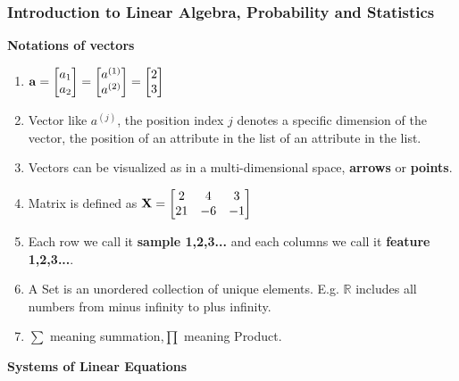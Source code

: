 \subsubsection{Introduction to Linear Algebra, Probability and Statistics}
\textbf{Notations of vectors}
\begin{enumerate}
    \item $\mathbf{a} = \begin{bmatrix}
        a_1 \\ a_2
    \end{bmatrix}
    = \begin{bmatrix}
        a^{(1)} \\
        a^{(2)}
    \end{bmatrix}
    = \begin{bmatrix}
        2 \\3
    \end{bmatrix}$
    \item  Vector like $a^{(j)}$, the position index $j$ denotes a specific dimension of the vector, the position of an attribute in the list of an attribute in the list.
    \item Vectors can be visualized as in a multi-dimensional space, \textbf{arrows} or \textbf{points}. 
    \item Matrix is defined as $\displaystyle \mathbf{X} = \begin{bmatrix}
        2 & 4 & 3\\
        21 & -6 & -1 \\
    \end{bmatrix}$
    \item Each row we call it \textbf{sample 1,2,3...} and each columns we call it \textbf{feature 1,2,3...}. 
    \item A Set is an unordered collection of unique elements. E.g. $\mathbb{R}$ includes all numbers from minus infinity to plus infinity.
    \item $\displaystyle \sum$ meaning summation,$\displaystyle \prod$ meaning Product.
\end{enumerate}
\textbf{Systems of Linear Equations}
